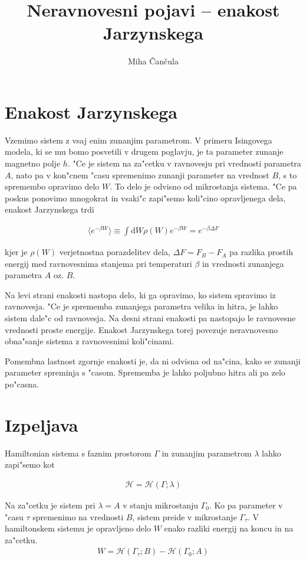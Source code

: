 \documentclass[a4paper,10pt]{article}
\title{Neravnovesni pojavi -- enakost Jarzynskega}
\author{Miha \v Can\v cula}
\begin{document}
\maketitle

\section{Enakost Jarzynskega}

Vzemimo sistem z vsaj enim zunanjim parametrom. V primeru Isingovega modela, ki se mu bomo posvetili v drugem poglavju, je ta parameter zunanje magnetno polje $h$. "Ce je sistem na za"cetku v ravnovesju pri vrednosti parametra $A$, nato pa v kon"cnem "casu spremenimo zunanji parameter na vrednost $B$, s to spremembo opravimo delo $W$. To delo je odvisno od mikrostanja sistema. "Ce pa poskus ponovimo mnogokrat in vsaki"c zapi"semo koli"cino opravljenega dela, enakost Jarzynskega trdi

\begin{align}
 \langle e^{-\beta W}\rangle \equiv \int \mathrm{d}W \rho(W) e^{-\beta W} = e^{-\beta \Delta F}
\end{align}

kjer je $\rho(W)$ verjetnostna porazdelitev dela, $\Delta F = F_B - F_A$ pa razlika prostih energij med ravnovesnima stanjema pri temperaturi $\beta$ in vrednosti zunanjega parametra $A$ oz. $B$. 

Na levi strani enakosti nastopa delo, ki ga opravimo, ko sistem spravimo iz ravnovesja. "Ce je sprememba zunanjega parametra velika in hitra, je lahko sistem dale"c od ravnovesja. Na desni strani enakosti pa nastopajo le ravnovesne vrednosti proste energije. Enakost Jarzynskega torej povezuje neravnovesno obna"sanje sistema z ravnovesnimi koli"cinami. 

Pomembna lastnost zgornje enakosti je, da ni odvisna od na"cina, kako se zunanji parameter spreminja s "casom. Sprememba je lahko poljubno hitra ali pa zelo po"casna. 
\section{Izpeljava}

Hamiltonian sistema s faznim prostorom $\Gamma$ in zunanjim parametrom $\lambda$ lahko zapi"semo kot

\begin{align}
 \mathcal{H} = \mathcal{H}(\Gamma; \lambda)
\end{align}

Na za"cetku je sistem pri $\lambda=A$ v stanju mikrostanju $\Gamma_0$. Ko pa parameter v "casu $\tau$ spremenimo na vrednosti $B$, sistem preide v mikrostanje $\Gamma_\tau$. V hamiltonskem sistemu je opravljeno delo $W$ enako razliki energij na koncu in na za"cetku. 
\begin{align}
 W = \mathcal{H}(\Gamma_\tau; B) - \mathcal{H}(\Gamma_0; A)
\end{align}
\end{document}
